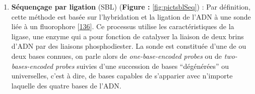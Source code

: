 \documentclass[12pt,a4paper,twoside]{ugathesis}
\providecommand{\tightlist}{%
  \setlength{\itemsep}{0pt}\setlength{\parskip}{0pt}}
\theoremstyle{definition}
\theoremstyle{definition}
\theoremstyle{definition}
\theoremstyle{remark}
\begin{document}
\newpage

\begin{enumerate}
\def\labelenumi{\arabic{enumi}.}
\setcounter{enumi}{1}
\tightlist
\item
  \textbf{Séquençage par ligation} (SBL) (\textbf{Figure :
  }\ref{fig:pictsblSeq}) : Par définition, cette méthode est basée sur
  l'hybridation et la ligation de l'ADN à une sonde liée à un
  fluorophore {[}\protect\hyperlink{ref-Tomkinson2006}{136}{]}. Ce
  processus utilise les caractéristiques de la ligase, une enzyme qui a
  pour fonction de catalyser la liaison de deux brins d'ADN par des
  liaisons phosphodiester. La sonde est constituée d'une de ou deux
  bases connues, on parle alors de \emph{one-base-encoded probes} ou de
  \emph{two-bases-encoded probes} suivies d'une succession de bases
  ``dégénérées'' ou universelles, c'est à dire, de bases capables de
  s'apparier avec n'importe laquelle des quatre bases de l'ADN.
\end{enumerate}
\end{document}
